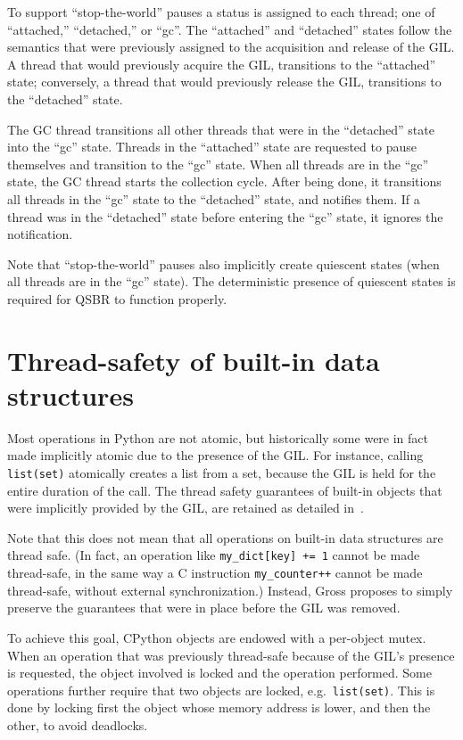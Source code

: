 To support ``stop-the-world'' pauses a status is assigned to each thread; one of ``attached,'' ``detached,'' or ``gc''.
The ``attached'' and ``detached'' states follow the semantics that were previously assigned to the acquisition and release of the GIL\@.
A thread that would previously acquire the GIL, transitions to the ``attached'' state; conversely, a thread that would previously release the GIL, transitions to the ``detached'' state.

The GC thread transitions all other threads that were in the ``detached'' state into the ``gc'' state.
Threads in the ``attached'' state are requested to pause themselves and transition to the ``gc'' state.
When all threads are in the ``gc'' state, the GC thread starts the collection cycle.
After being done, it transitions all threads in the ``gc'' state to the ``detached'' state, and notifies them.
If a thread was in the ``detached'' state before entering the ``gc'' state, it ignores the notification.

Note that ``stop-the-world'' pauses also implicitly create quiescent states (when all threads are in the ``gc'' state).
The deterministic presence of quiescent states is required for QSBR to function properly.


\section{Thread-safety of built-in data structures}\label{sec:thread-safety-of-builtin-data-structures}

Most operations in Python are not atomic, but historically some were in fact made implicitly atomic due to the presence of the GIL\@.
For instance, calling \texttt{{list(set)}} atomically creates a list from a set, because the GIL is held for the entire duration of the call.
The thread safety guarantees of built-in objects that were implicitly provided by the GIL, are retained as detailed in~\cite[\S Container Thread-Safety]{pep703}.

Note that this does not mean that all operations on built-in data structures are thread safe.
(In fact, an operation like \texttt{{my\_dict[key] += 1}} cannot be made thread-safe, in the same way a C instruction \texttt{{my\_counter++}} cannot be made thread-safe, without external synchronization.)
Instead, Gross proposes to simply preserve the guarantees that were in place before the GIL was removed.

To achieve this goal, CPython objects are endowed with a per-object mutex.
When an operation that was previously thread-safe because of the GIL's presence is requested, the object involved is locked and the operation performed.
Some operations further require that two objects are locked, e.g.\ \texttt{{list(set)}}.
This is done by locking first the object whose memory address is lower, and then the other, to avoid deadlocks.

